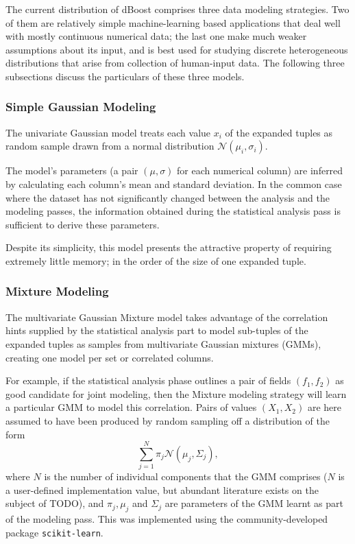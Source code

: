 The current distribution of dBoost comprises three data modeling strategies. Two of them are relatively simple machine-learning based applications that deal well with mostly continuous numerical data; the last one make much weaker assumptions about its input, and is best used for studying discrete heterogeneous distributions that arise from collection of human-input data. The following three subsections discuss the particulars of these three models.

\subsubsection{Simple Gaussian Modeling}
\label{sec:gaus_model}
The univariate Gaussian model treats each value $x_i$ of the expanded tuples as random sample drawn from a normal distribution $\mathcal N(\mu_i, \sigma_i)$.

The model's parameters (a pair $(\mu, \sigma)$ for each numerical column) are inferred by calculating each column's mean and standard deviation. In the common case where the dataset has not significantly changed between the analysis and the modeling passes, the information obtained during the statistical analysis pass is sufficient to derive these parameters.

Despite its simplicity, this model presents the attractive property of requiring extremely little memory; in the order of the size of one expanded tuple.

\subsubsection{Mixture Modeling}
The multivariate Gaussian Mixture model takes advantage of the correlation hints supplied by the statistical analysis part to model sub-tuples of the expanded tuples as samples from multivariate Gaussian mixtures (GMMs), creating one model per set or correlated columns.

For example, if the statistical analysis phase outlines a pair of fields $(f_1, f_2)$ as good candidate for joint modeling, then the Mixture modeling strategy will learn a particular GMM to model this correlation. Pairs of values $(X_1, X_2)$ are here assumed to have been produced by random sampling off a distribution of the form
\[ \sum_{j=1}^{N} \pi_j \mathcal N(\mu_j, \Sigma_j), \]
where $N$ is the number of individual components that the GMM comprises ($N$ is a user-defined implementation value, but abundant literature exists on the subject of TODO), and $\pi_j, \mu_j$ and $\Sigma_j$ are parameters of the GMM learnt as part of the modeling pass. This was implemented using the community-developed package \texttt{scikit-learn}. 

